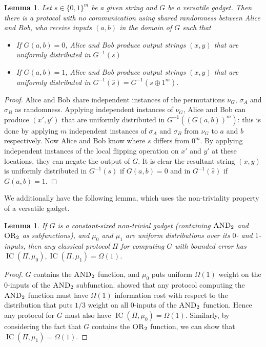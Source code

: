 \documentclass[10pt,a4paper]{article}
\newtheorem{lemma}[theorem]{Lemma}
\theoremstyle{definition}
\renewcommand{\>}{\rangle}
\newcommand{\<}{\langle}
\newcommand{\OR}{\textsc{OR}}
\newcommand{\AND}{\textsc{AND}}
\DeclareMathOperator{\IC}{IC}
\begin{document}
\begin{lemma}\label{lem:s-sampling}
Let $s\in\{0,1\}^m$ be a given string and $G$ be a versatile gadget. Then there is a protocol with no communication using shared randomness between Alice and Bob, who receive inputs $(a,b)$ in the domain of $G$ such that
\begin{itemize}
 \item If $G(a,b)=0$, Alice and Bob produce output strings $(x,y)$ that are uniformly distributed in $G^{-1}(s)$
 \item If $G(a,b)=1$, Alice and Bob produce output strings $(x,y)$ that are uniformly distributed in $G^{-1}(\hat{s}) = G^{-1}(s\oplus1^m)$.
\end{itemize}
\end{lemma}

\begin{proof}
Alice and Bob share independent instances of the permutations $\nu_G$, $\sigma_A$ and $\sigma_B$ as randomness. Applying independent instances of $\nu_G$, Alice and Bob can produce $(x',y')$ that are uniformly distributed in $G^{-1}((G(a,b))^m)$: this is done by applying $m$ independent instances of $\sigma_A$ and $\sigma_B$ from $\nu_G$ to $a$ and $b$ respectively. Now Alice and Bob know where $s$ differs from $0^m$. By applying independent instances of the local flipping operation on $x'$ and $y'$ at these locations, they can negate the output of $G$. It is clear the resultant string $(x,y)$ is uniformly distributed in $G^{-1}(s)$ if $G(a,b)=0$ and in $G^{-1}(\hat{s})$ if $G(a,b)=1$.
\end{proof}

We additionally have the following lemma, which
uses the non-triviality property of a versatile gadget.

\begin{lemma}\label{lem:ANDOR-classical}
If $G$ is a constant-sized non-trivial gadget (containing $\AND_2$ and $\OR_2$ as subfunctions), and $\mu_0$ and 
$\mu_1$ are uniform distributions over its $0$- and $1$-inputs, 
then any classical protocol $\Pi$ for computing $G$ with bounded 
error has $\IC(\Pi,\mu_0), \IC(\Pi,\mu_1) = \Omega(1)$.
\end{lemma}

\begin{proof}
$G$ contains the $\AND_2$ function, and $\mu_0$ puts uniform 
$\Omega(1)$ weight on the 0-inputs of the $\AND_2$ subfunction. 
\cite{BJKS04} showed that any protocol computing the $\AND_2$ 
function must have $\Omega(1)$ information cost with
respect to the distribution that puts
$1/3$ weight on all $0$-inputs of the $\AND_2$ function. Hence any 
protocol for $G$ must also have $\IC(\Pi,\mu_0)=\Omega(1)$. 
Similarly, by considering the fact that $G$ contains the $\OR_2$ 
function, we can show that $\IC(\Pi,\mu_1)=\Omega(1)$.
\end{proof}
\end{document}
